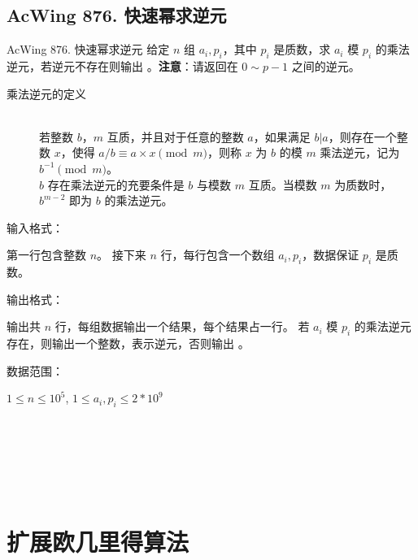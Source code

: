 \subsection{AcWing 876. 快速幂求逆元}
\begin{titledbox}{AcWing 876. 快速幂求逆元}
    给定 $n$ 组 $a_i, p_i$，其中 $p_i$ 是质数，求 $a_i$ 模 $p_i$ 的乘法逆元，若逆元不存在则输出 。\textbf{注意}：请返回在 $0 \sim p-1$ 之间的逆元。

    \begin{description}
        \item[乘法逆元的定义] \\
        若整数 $b，m$ 互质，并且对于任意的整数 $a$，如果满足 $b|a$，则存在一个整数 $x$，使得 $a/b≡a \times x \pmod m$，则称 $x$ 为 $b$ 的模 $m$ 乘法逆元，记为 $b^{-1} \pmod m$。\\
        $b$ 存在乘法逆元的充要条件是 $b$ 与模数 $m$ 互质。当模数 $m$ 为质数时，$b^{m-2}$ 即为 $b$ 的乘法逆元。
    \end{description}

    输入格式：

    第一行包含整数 $n$。 接下来 $n$ 行，每行包含一个数组 $a_i, p_i$，数据保证 $p_i$ 是质数。

    输出格式：

    输出共 $n$ 行，每组数据输出一个结果，每个结果占一行。 若 $a_i$ 模 $p_i$ 的乘法逆元存在，则输出一个整数，表示逆元，否则输出 。

    数据范围：

    $1 \le n \le 10^5$, $1 \le a_i,p_i \le 2*10^9$

    \begin{inputblock}
         \\
         \\
    \end{inputblock}
    \begin{outputblock}
         \\
         \\
    \end{outputblock}
\end{titledbox}


\section{扩展欧几里得算法}

